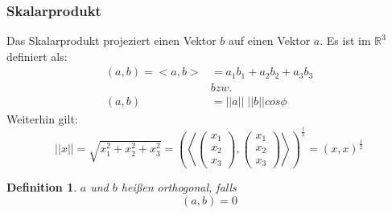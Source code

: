 \documentclass[12pt,a4paper]{article}%
\newtheorem{definition}[satz]{Definition}
\numberwithin{equation}{section}
\newcommand{\R}{\mathbb{R}} %
\def\vecT#1{\left(\begin{array}{c} #1 \end{array}\right)}
\numberwithin{equation}{subsection}
\begin{document}
  \subsubsection{Skalarprodukt}
  Das Skalarprodukt projeziert einen Vektor $b$ auf einen Vektor $a$. Es ist im $\R^3$ definiert als:
  \begin{align}
    (a,b) = <a,b> &= a_1 b_1 + a_2 b_2 + a_3 b_3 \\
    &bzw. \nonumber \\
    (a,b) &= ||a|| \; ||b|| cos \phi
  \end{align}
  Weiterhin gilt:
  \begin{equation}
  ||x|| = \sqrt{x_1^2 + x_2^2 + x_3^2} = \left(\left<\vecT{x_1 \\ x_2 \\ x_3},\vecT{x_1 \\ x_2 \\ x_3}\right>\right)^{\frac{1}{2}} = (x,x)^{\frac{1}{2}}
  \end{equation}
  \begin{definition}
	  $a$ und $b$ heißen orthogonal, falls 
	  \begin{equation*}
	    (a,b) = 0 
	  \end{equation*}
  \end{definition}
  
\end{document}
